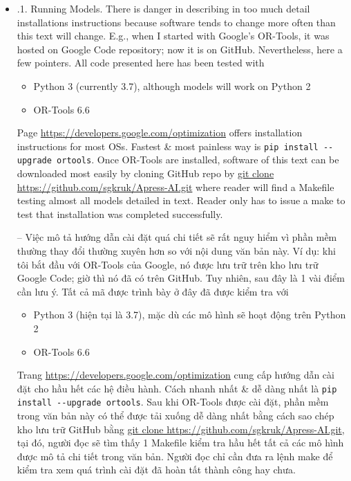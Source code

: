 \documentclass{article}
\begin{document}
\begin{itemize}
\begin{itemize}
\begin{itemize}
        \end{itemize}
        \begin{itemize}
            \item {.1. Running Models.} There is danger in describing in too much detail installations instructions because software tends to change more often than this text will change. E.g., when I started with Google's OR-Tools, it was hosted on Google Code repository; now it is on GitHub. Nevertheless, here a few pointers. All code presented here has been tested with
            \begin{itemize}
                \item Python 3 (currently 3.7), although models will work on Python 2
                \item OR-Tools 6.6
            \end{itemize}
            Page \url{https://developers.google.com/optimization} offers installation instructions for most OSs. Fastest \& most painless way is \verb|pip install --upgrade ortools|. Once OR-Tools are installed, software of this text can be downloaded most easily by cloning GitHub repo by \url{git clone https://github.com/sgkruk/Apress-AI.git} where reader will find a Makefile testing almost all models detailed in text. Reader only has to issue a make to test that installation was completed successfully.

            -- Việc mô tả hướng dẫn cài đặt quá chi tiết sẽ rất nguy hiểm vì phần mềm thường thay đổi thường xuyên hơn so với nội dung văn bản này. Ví dụ: khi tôi bắt đầu với OR-Tools của Google, nó được lưu trữ trên kho lưu trữ Google Code; giờ thì nó đã có trên GitHub. Tuy nhiên, sau đây là 1 vài điểm cần lưu ý. Tất cả mã được trình bày ở đây đã được kiểm tra với
            \begin{itemize}
                \item Python 3 (hiện tại là 3.7), mặc dù các mô hình sẽ hoạt động trên Python 2
                \item OR-Tools 6.6
            \end{itemize}
            Trang \url{https://developers.google.com/optimization} cung cấp hướng dẫn cài đặt cho hầu hết các hệ điều hành. Cách nhanh nhất \& dễ dàng nhất là \verb|pip install --upgrade ortools|. Sau khi OR-Tools được cài đặt, phần mềm trong văn bản này có thể được tải xuống dễ dàng nhất bằng cách sao chép kho lưu trữ GitHub bằng \url{git clone https://github.com/sgkruk/Apress-AI.git}, tại đó, người đọc sẽ tìm thấy 1 Makefile kiểm tra hầu hết tất cả các mô hình được mô tả chi tiết trong văn bản. Người đọc chỉ cần đưa ra lệnh make để kiểm tra xem quá trình cài đặt đã hoàn tất thành công hay chưa.


\end{itemize}
\end{itemize}
\end{itemize}
\end{document}
